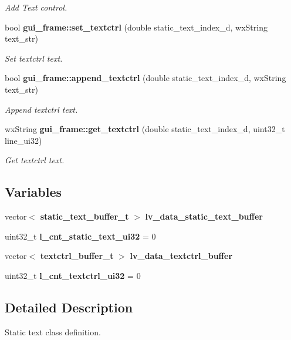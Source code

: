 \begin{DoxyCompactItemize}
\begin{DoxyCompactList}\small\item\em Add Text control. \end{DoxyCompactList}\item 
bool \textbf{ gui\+\_\+frame\+::set\+\_\+textctrl} (double static\+\_\+text\+\_\+index\+\_\+d, wx\+String text\+\_\+str)
\begin{DoxyCompactList}\small\item\em Set textctrl text. \end{DoxyCompactList}\item 
bool \textbf{ gui\+\_\+frame\+::append\+\_\+textctrl} (double static\+\_\+text\+\_\+index\+\_\+d, wx\+String text\+\_\+str)
\begin{DoxyCompactList}\small\item\em Append textctrl text. \end{DoxyCompactList}\item 
wx\+String \textbf{ gui\+\_\+frame\+::get\+\_\+textctrl} (double static\+\_\+text\+\_\+index\+\_\+d, uint32\+\_\+t line\+\_\+ui32)
\begin{DoxyCompactList}\small\item\em Get textctrl text. \end{DoxyCompactList}\end{DoxyCompactItemize}
\subsection*{Variables}
\begin{DoxyCompactItemize}
\item 
vector$<$ \textbf{ static\+\_\+text\+\_\+buffer\+\_\+t} $>$ \textbf{ lv\+\_\+data\+\_\+static\+\_\+text\+\_\+buffer}
\item 
\mbox{\label{group___static__text_ga36d872b1240e208aac1eb9ea3802cab3}} 
uint32\+\_\+t {\bfseries l\+\_\+cnt\+\_\+static\+\_\+text\+\_\+ui32} = 0
\item 
vector$<$ \textbf{ textctrl\+\_\+buffer\+\_\+t} $>$ \textbf{ lv\+\_\+data\+\_\+textctrl\+\_\+buffer}
\item 
\mbox{\label{group___static__text_ga408c63166cadb78b37c89ad5aeb7cf33}} 
uint32\+\_\+t {\bfseries l\+\_\+cnt\+\_\+textctrl\+\_\+ui32} = 0
\end{DoxyCompactItemize}


\subsection{Detailed Description}
Static text class definition. 

